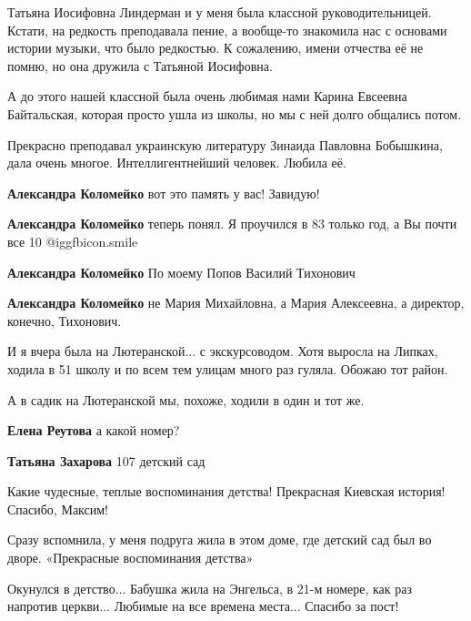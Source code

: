 \begin{itemize}
\begin{itemize}
Татьяна Иосифовна Линдерман и у меня была классной руководительницей. Кстати,
на редкость преподавала пение, а вообще-то знакомила нас с основами истории
музыки, что было редкостью. К сожалению, имени отчества её не помню, но она
дружила с Татьяной Иосифовна.

А до этого нашей классной была очень любимая нами Карина Евсеевна Байтальская,
которая просто ушла из школы, но мы с ней долго общались потом.

Прекрасно преподавал украинскую литературу Зинаида Павловна Бобышкина, дала очень многое. Интеллигентнейший человек. Любила её.

\textbf{Александра Коломейко} вот это память у вас! Завидую!

\textbf{Александра Коломейко} теперь понял. Я проучился в 83 только год, а Вы почти все 10 @igg{fbicon.smile} 

\textbf{Александра Коломейко} По моему Попов Василий Тихонович

\textbf{Александра Коломейко} не Мария Михайловна, а Мария Алексеевна, а директор, конечно, Тихонович.
\end{itemize} %


И я вчера была на Лютеранской... с экскурсоводом. Хотя выросла на Липках,
ходила в 51 школу и по всем тем улицам много раз гуляла. Обожаю тот район.



А в садик на Лютеранской мы, похоже, ходили в один и тот же.

\begin{itemize} %
\textbf{Елена Реутова} а какой номер?

\textbf{Татьяна Захарова} 107 детский сад
\end{itemize} %


Какие чудесные, теплые воспоминания детства! Прекрасная Киевская история! Спасибо, Максим!


Сразу вспомнила, у меня подруга жила в этом доме, где детский сад был во дворе.
«Прекрасные воспоминания детства»


Окунулся в детство... Бабушка жила на Энгельса, в 21-м номере, как раз напротив
церкви... Любимые на все времена места... Спасибо за пост!


\end{itemize}
